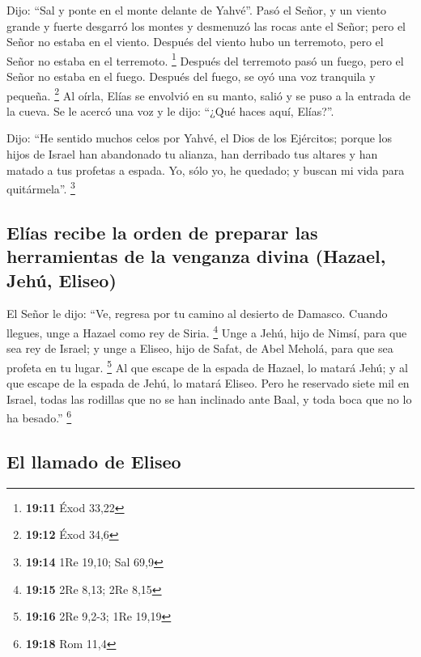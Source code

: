 \begin{paracol}{2}
 Dijo: ``Sal y ponte en el monte delante de Yahvé''. Pasó
el Señor, y un viento grande y fuerte desgarró los montes y desmenuzó
las rocas ante el Señor; pero el Señor no estaba en el viento. Después
del viento hubo un terremoto, pero el Señor no estaba en el terremoto.
\footnote{\textbf{19:11} Éxod 33,22}  Después del
terremoto pasó un fuego, pero el Señor no estaba en el fuego. Después
del fuego, se oyó una voz tranquila y pequeña. \footnote{\textbf{19:12}
  Éxod 34,6}  Al oírla, Elías se envolvió en su manto,
salió y se puso a la entrada de la cueva. Se le acercó una voz y le
dijo: ``¿Qué haces aquí, Elías?''.

 Dijo: ``He sentido muchos celos por Yahvé, el Dios de
los Ejércitos; porque los hijos de Israel han abandonado tu alianza, han
derribado tus altares y han matado a tus profetas a espada. Yo, sólo yo,
he quedado; y buscan mi vida para quitármela''. \footnote{\textbf{19:14}
  1Re 19,10; Sal 69,9}

\hypertarget{eluxedas-recibe-la-orden-de-preparar-las-herramientas-de-la-venganza-divina-hazael-jehuxfa-eliseo}{%
\subsection{Elías recibe la orden de preparar las herramientas de la
venganza divina (Hazael, Jehú,
Eliseo)}\label{eluxedas-recibe-la-orden-de-preparar-las-herramientas-de-la-venganza-divina-hazael-jehuxfa-eliseo}}

 El Señor le dijo: ``Ve, regresa por tu camino al
desierto de Damasco. Cuando llegues, unge a Hazael como rey de Siria.
\footnote{\textbf{19:15} 2Re 8,13; 2Re 8,15}  Unge a
Jehú, hijo de Nimsí, para que sea rey de Israel; y unge a Eliseo, hijo
de Safat, de Abel Meholá, para que sea profeta en tu lugar. \footnote{\textbf{19:16}
  2Re 9,2-3; 1Re 19,19}  Al que escape de la espada de
Hazael, lo matará Jehú; y al que escape de la espada de Jehú, lo matará
Eliseo.  Pero he reservado siete mil en Israel, todas las
rodillas que no se han inclinado ante Baal, y toda boca que no lo ha
besado.'' \footnote{\textbf{19:18} Rom 11,4}

\hypertarget{el-llamado-de-eliseo}{%
\subsection{El llamado de Eliseo}\label{el-llamado-de-eliseo}}


\end{paracol}
